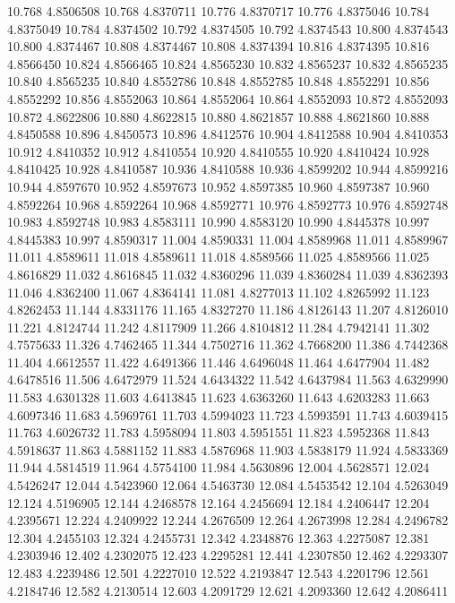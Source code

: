 10.768 4.8506508
10.768 4.8370711
10.776 4.8370717
10.776 4.8375046
10.784 4.8375049
10.784 4.8374502
10.792 4.8374505
10.792 4.8374543
10.800 4.8374543
10.800 4.8374467
10.808 4.8374467
10.808 4.8374394
10.816 4.8374395
10.816 4.8566450
10.824 4.8566465
10.824 4.8565230
10.832 4.8565237
10.832 4.8565235
10.840 4.8565235
10.840 4.8552786
10.848 4.8552785
10.848 4.8552291
10.856 4.8552292
10.856 4.8552063
10.864 4.8552064
10.864 4.8552093
10.872 4.8552093
10.872 4.8622806
10.880 4.8622815
10.880 4.8621857
10.888 4.8621860
10.888 4.8450588
10.896 4.8450573
10.896 4.8412576
10.904 4.8412588
10.904 4.8410353
10.912 4.8410352
10.912 4.8410554
10.920 4.8410555
10.920 4.8410424
10.928 4.8410425
10.928 4.8410587
10.936 4.8410588
10.936 4.8599202
10.944 4.8599216
10.944 4.8597670
10.952 4.8597673
10.952 4.8597385
10.960 4.8597387
10.960 4.8592264
10.968 4.8592264
10.968 4.8592771
10.976 4.8592773
10.976 4.8592748
10.983 4.8592748
10.983 4.8583111
10.990 4.8583120
10.990 4.8445378
10.997 4.8445383
10.997 4.8590317
11.004 4.8590331
11.004 4.8589968
11.011 4.8589967
11.011 4.8589611
11.018 4.8589611
11.018 4.8589566
11.025 4.8589566
11.025 4.8616829
11.032 4.8616845
11.032 4.8360296
11.039 4.8360284
11.039 4.8362393
11.046 4.8362400
11.067 4.8364141
11.081 4.8277013
11.102 4.8265992
11.123 4.8262453
11.144 4.8331176
11.165 4.8327270
11.186 4.8126143
11.207 4.8126010
11.221 4.8124744
11.242 4.8117909
11.266 4.8104812
11.284 4.7942141
11.302 4.7575633
11.326 4.7462465
11.344 4.7502716
11.362 4.7668200
11.386 4.7442368
11.404 4.6612557
11.422 4.6491366
11.446 4.6496048
11.464 4.6477904
11.482 4.6478516
11.506 4.6472979
11.524 4.6434322
11.542 4.6437984
11.563 4.6329990
11.583 4.6301328
11.603 4.6413845
11.623 4.6363260
11.643 4.6203283
11.663 4.6097346
11.683 4.5969761
11.703 4.5994023
11.723 4.5993591
11.743 4.6039415
11.763 4.6026732
11.783 4.5958094
11.803 4.5951551
11.823 4.5952368
11.843 4.5918637
11.863 4.5881152
11.883 4.5876968
11.903 4.5838179
11.924 4.5833369
11.944 4.5814519
11.964 4.5754100
11.984 4.5630896
12.004 4.5628571
12.024 4.5426247
12.044 4.5423960
12.064 4.5463730
12.084 4.5453542
12.104 4.5263049
12.124 4.5196905
12.144 4.2468578
12.164 4.2456694
12.184 4.2406447
12.204 4.2395671
12.224 4.2409922
12.244 4.2676509
12.264 4.2673998
12.284 4.2496782
12.304 4.2455103
12.324 4.2455731
12.342 4.2348876
12.363 4.2275087
12.381 4.2303946
12.402 4.2302075
12.423 4.2295281
12.441 4.2307850
12.462 4.2293307
12.483 4.2239486
12.501 4.2227010
12.522 4.2193847
12.543 4.2201796
12.561 4.2184746
12.582 4.2130514
12.603 4.2091729
12.621 4.2093360
12.642 4.2086411
